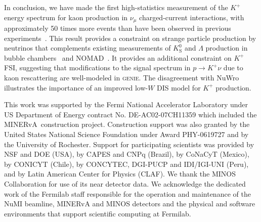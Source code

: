 \documentclass[aps,prl,preprint,showpacs,superscriptaddress,nofootinbib,floatfix,linenumbers]{revtex4}
\newcommand{\minerva}{MINERvA\xspace}
\newcommand{\genie}{\textsc{genie}\xspace}
\newcommand{\pknu}{\ensuremath{p \rightarrow K^{+} \nu}\xspace}
\newcommand{\numu}{\ensuremath{\nu_{\mu}}\xspace}
\newcommand{\lam}{\ensuremath{\Lambda}\xspace}
\newcommand{\kp}{\ensuremath{K^{+}}\xspace}
\newcommand{\kzS}{\ensuremath{K^{0}_{\mathrm{S}}}\xspace}
\begin{document}
In conclusion, we have made the first high-statistics measurement of the \kp energy spectrum for kaon production in \numu charged-current interactions, with approximately 50 times more events than have been observed in previous experiments~\cite{anl2, anl12ft, bnl7ft, gargamelle}. This result provides a constraint on strange particle production by neutrinos that complements existing measurements of \kzS and \lam production in bubble chambers~\cite{bebc1, bebc2, bebc3, bebc4, fnal15a, fnal15b} and NOMAD~\cite{nomad}. It provides an additional constraint on \kp FSI, suggesting that modifications to the signal spectrum in \pknu due to kaon rescattering are well-modeled in \genie. The disagreement with NuWro illustrates the importance of an improved low-$W$ DIS model for \kp production.

\begin{acknowledgments}

This work was supported by the Fermi National Accelerator Laboratory
under US Department of Energy contract No. DE-AC02-07CH11359 which
included the \minerva\ construction project.  Construction support was
also granted by the United States National Science Foundation under
Award PHY-0619727 and by the University of Rochester. Support for
participating scientists was provided by NSF and DOE (USA), by CAPES
and CNPq (Brazil), by CoNaCyT (Mexico), by CONICYT (Chile), by
CONCYTEC, DGI-PUCP and IDI/IGI-UNI (Peru), and by Latin American
Center for Physics (CLAF).  We thank the
MINOS Collaboration for use of its near detector data. We acknowledge
the dedicated work of the Fermilab staff responsible for the operation
and maintenance of the NuMI beamline, MINERvA and MINOS detectors and
the physical and software environments that support scientific
computing at Fermilab.

\end{acknowledgments}
\end{document}
